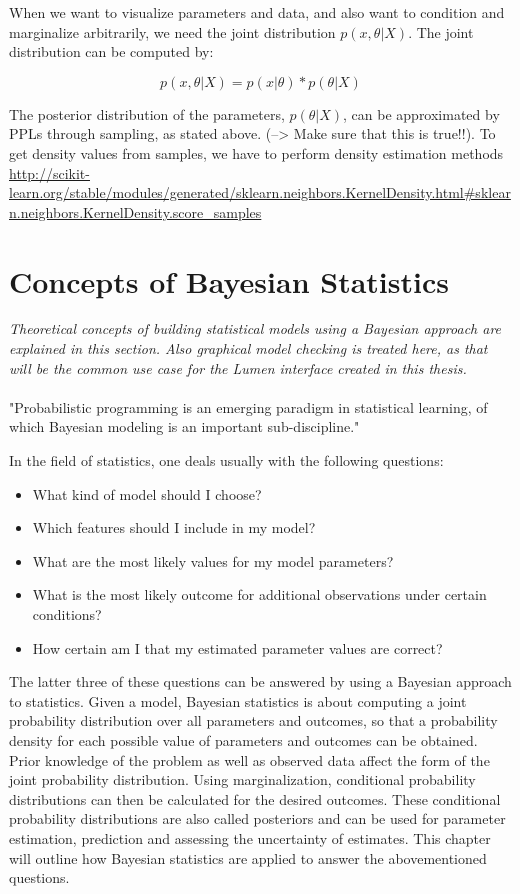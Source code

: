 \documentclass{article}
\begin{document}
When we want to visualize parameters and data, and also want to condition and marginalize arbitrarily, we need the joint distribution $p(x,\theta|X)$. The joint distribution can be computed by:

\begin{equation}
p(x,\theta|X) = p(x|\theta) * p(\theta|X)
\end{equation}

The posterior distribution of the parameters, $p(\theta|X)$, can be approximated by PPLs through sampling, as stated above. (--> Make sure that this is true!!). To get density values from samples, we have to perform density estimation methods \url{http://scikit-learn.org/stable/modules/generated/sklearn.neighbors.KernelDensity.html#sklearn.neighbors.KernelDensity.score_samples}

\section{Concepts of Bayesian Statistics}

\textit{Theoretical concepts of building statistical models using a Bayesian approach are explained in this section. Also graphical model checking is treated here, as that will be the common use case for the Lumen interface created in this thesis.}
\\
\\
"Probabilistic programming is an emerging paradigm in statistical learning, of which Bayesian modeling is an important sub-discipline." \cite{Salvatier2016}


In the field of statistics, one deals usually with the following questions:

\begin{itemize}
	\item What kind of model should I choose?
	\item Which features should I include in my model?
	\item What are the most likely values for my model parameters?
	\item What is the most likely outcome for additional observations under certain conditions?
	\item How certain am I that my estimated parameter values are correct?
\end{itemize}
The latter three of these questions can be answered by using a Bayesian approach to statistics. Given a model, Bayesian statistics is about computing a joint probability distribution over all parameters and outcomes, so that a probability density for each possible value of parameters and outcomes can be obtained. Prior knowledge of the problem as well as observed data affect the form of the joint probability distribution. Using marginalization, conditional probability distributions can then be calculated for the desired outcomes. These conditional probability distributions are also called posteriors and can be used for parameter estimation, prediction and assessing the uncertainty of estimates. This chapter will outline how Bayesian statistics are applied to answer the abovementioned questions.
\end{document}
